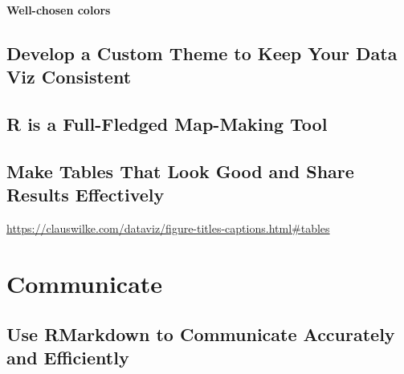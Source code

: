 \documentclass[
]{book}
\begin{document}
\hypertarget{well-chosen-colors}{%
\subsection{Well-chosen colors}\label{well-chosen-colors}}

\hypertarget{develop-a-custom-theme-to-keep-your-data-viz-consistent}{%
\chapter*{Develop a Custom Theme to Keep Your Data Viz Consistent}\label{develop-a-custom-theme-to-keep-your-data-viz-consistent}}

\hypertarget{r-is-a-full-fledged-map-making-tool}{%
\chapter*{R is a Full-Fledged Map-Making Tool}\label{r-is-a-full-fledged-map-making-tool}}

\hypertarget{make-tables-that-look-good-and-share-results-effectively}{%
\chapter*{Make Tables That Look Good and Share Results Effectively}\label{make-tables-that-look-good-and-share-results-effectively}}

\url{https://clauswilke.com/dataviz/figure-titles-captions.html\#tables}

\hypertarget{part-communicate}{%
\part*{Communicate}\label{part-communicate}}

\hypertarget{use-rmarkdown-to-communicate-accurately-and-efficiently}{%
\chapter*{Use RMarkdown to Communicate Accurately and Efficiently}\label{use-rmarkdown-to-communicate-accurately-and-efficiently}}
\end{document}
